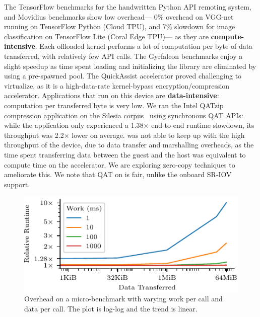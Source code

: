 The TensorFlow benchmarks for the handwritten Python API remoting system, and Movidius benchmarks show low overhead---%
0\% overhead on VGG-net running on TensorFlow Python (Cloud TPU), and 7\% slowdown for image classification on TensorFlow Lite (Coral Edge TPU)---%
as they are \textbf{compute-intensive}. Each offloaded kernel performs a lot of computation per byte of data transferred, with relatively few API calls.
The Gyrfalcon benchmarks enjoy a slight speedup as time spent loading and initializing the library are eliminated by using a pre-spawned \worker pool.
The QuickAssist accelerator proved challenging to virtualize, as it is a high-data-rate kernel-bypass encryption/compression accelerator.
Applications that run on this device are \textbf{data-intensive}: computation per transferred byte is very low.
We ran the Intel QATzip compression application on the Silesia corpus~\cite{silesia} using synchronous QAT APIs: while the application only experienced a 1.38$\times$ end-to-end runtime slowdown, its throughput was 2.2$\times$ lower on average.
\AvA was not able to keep up with the high throughput of the device, due to data transfer and marshalling overheads, as the time spent transferring data between the guest and the host was equivalent to compute time on the accelerator.
We are exploring zero-copy techniques to ameliorate this. We note that QAT on \AvA is fair, unlike the onboard SR-IOV support.



\label{s:micro_benchmark}

\begin{figure}
  \centering
	\includegraphics[width=\columnwidth]{ava/data/microbenchmark/overhead_plot.pdf}%
    \vspace*{-.5em}
	\caption{Overhead on a micro-benchmark with varying work per call and data per call. The plot is log-log and the trend is linear.
    }
	\label{fig:microbenchmark_overhead}
\end{figure}

